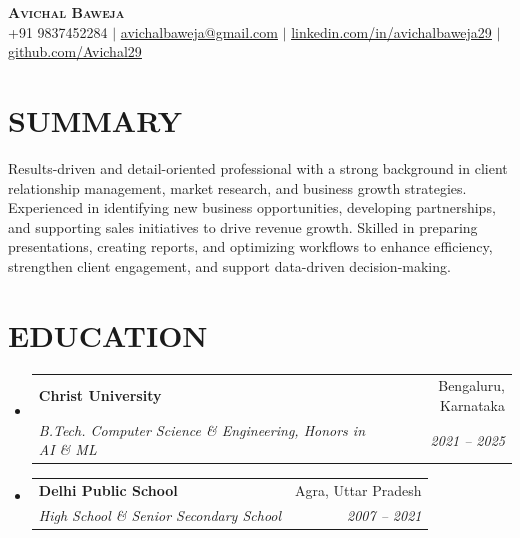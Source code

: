 \documentclass[letterpaper,11pt]{article}
\makeatletter
\newcommand{\resumeSubheading}[4]{
  \vspace{-2pt}\item
    \begin{tabular*}{0.97\textwidth}[t]{l@{\extracolsep{\fill}}r}
      \textbf{#1} & #2 \\
      \textit{\small #3} & \textit{\small #4} \\
    \end{tabular*}\vspace{-7pt}
}
\newcommand{\resumeSubHeadingListStart}{\begin{itemize}[leftmargin=0.15in,topmargin=0.10in, label={}]}
\newcommand{\resumeSubHeadingListEnd}{\end{itemize}\vspace{-10pt}}
\makeatother
\begin{document}

\begin{center}
    \textbf{\Huge \scshape Avichal Baweja} \\ \vspace{1pt}
    \small +91 9837452284 $|$ \href{mailto:avichalbaweja@gmail.com}{\underline{avichalbaweja@gmail.com}} $|$ 
    \href{https://www.linkedin.com/in/avichalbaweja29/}{\underline{linkedin.com/in/avichalbaweja29}} $|$
    \href{https://github.com/avichal29}{\underline{github.com/Avichal29}}
\end{center}
\section{SUMMARY}
Results-driven and detail-oriented professional with a strong background in client relationship management, market research, and business growth strategies. Experienced in identifying new business opportunities, developing partnerships, and supporting sales initiatives to drive revenue growth. Skilled in preparing presentations, creating reports, and optimizing workflows to enhance efficiency, strengthen client engagement, and support data-driven decision-making.
\section{EDUCATION}
  \resumeSubHeadingListStart
    \resumeSubheading
      {Christ University}{Bengaluru, Karnataka}
      {B.Tech. Computer Science \& Engineering, Honors in AI \& ML}{2021 -- 2025}
    \resumeSubheading
      {Delhi Public School}{Agra, Uttar Pradesh}
      {High School \& Senior Secondary School }{2007 -- 2021}
  \resumeSubHeadingListEnd


\end{document}
